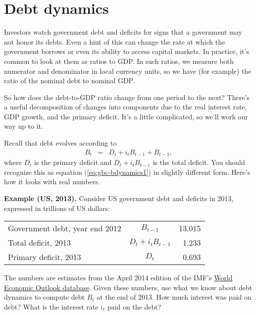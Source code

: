 %
\section{Debt dynamics}

Investors watch government debt and deficits
for signs that a government may not honor its debts.
Even a hint of this can change the rate at which the government
borrows or even its ability to access capital markets.
In practice, it's common to look at them as ratios to GDP.
In such ratios, we measure both numerator and denominator in local currency units,
so we have (for example) the ratio of the nominal debt to nominal GDP.

So how does the debt-to-GDP ratio 
 change from one period to the next?
There's a useful decomposition of changes
into components due to the real interest rate, GDP growth, and the
primary deficit.
It's a little complicated, so we'll work our way up to it.

Recall that debt evolves according to
\begin{eqnarray}
    B_{t} &=& D_t + i_t B_{t-1} + B_{t-1}  ,
    \label{eq:gbc-bdynamics1a}
\end{eqnarray}
where $D_t$ is the primary deficit
and $D_t + i_t B_{t-1}$ is the total deficit.
You should recognize this as equation (\ref{eq:gbc-bdynamics1})
in slightly different form.
Here's how it looks with real numbers.

{\bf Example (US, 2013).}
Consider US government debt and deficits in 2013,
expressed in trillions of US dollars:

\begin{center}
\begin{tabular}{lcr}
\toprule
%
Government debt, year end 2012  &  $B_{t-1}$    & 13.015 \\
Total deficit, 2013             &  $ D_t + i_t B_{t-1}$ & 1.233 \\
Primary deficit, 2013           &  $D_t$        &  0.693 \\
\bottomrule
\end{tabular}
\end{center}

The numbers are estimates from the April 2014 edition of the IMF's
\href{http://www.imf.org/external/ns/cs.aspx?id=28}{World Economic Outlook database}.
%
Given these numbers,
use what we know about debt dynamics to compute debt $B_t$ at the end of 2013.
How much interest was paid on debt?
What is the interest rate $i_t$ paid on the debt?


